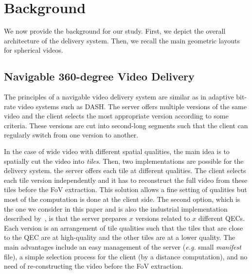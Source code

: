 \section{Background}

We now provide the background for our study.
First, we depict the overall architecture of the delivery system.
Then, we recall the main geometric layouts for spherical videos.

\subsection{Navigable 360-degree Video Delivery}

The principles of a navigable video delivery system are similar as in adaptive bit-rate
video systems such as \ac{DASH}. The server offers multiple versions of the same video
and the client
selects the most appropriate version according to some criteria. These versions
are cut into second-long segments such that the client can regularly switch from one
version to another. 

In the case of wide video with different spatial qualities, the main idea is to spatially cut
the video into \emph{tiles}.
Then, two implementations are possible for the delivery system.  the server
offers each tile at different qualities. The client selects each tile version independently
and it has to reconstruct
the full video from these tiles before the \ac{FoV} extraction. This solution allows a
fine setting of qualities but
most of the computation is done at the client side. The second option,
which is the one we consider in this paper and is also the industrial implementation described
by~\citet{facebook}, is that
the server prepares $x$ versions related to $x$ different \acp{QEC}. Each version
is an arrangement of tile
qualities such that the tiles that are close to the \ac{QEC} are at high-quality
and the other tiles
are at a lower quality. The main advantages include an easy management of the server
(\textit{e.g.} small \emph{manifest} file), a simple selection process for the client (by
a distance computation), and no need of re-constructing the video before the \ac{FoV} extraction.

